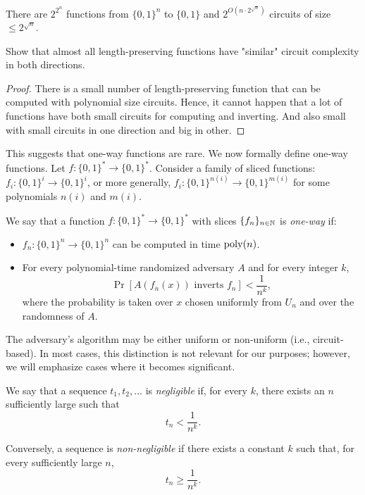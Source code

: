 \begin{statement}
    There are $2^{2^n}$ functions from $\{0, 1\}^n$ to $\{0, 1\}$ and $2^{O(n \cdot 2^{\sqrt n})}$ circuits of size $\leq 2^{\sqrt n}$.
\end{statement}

\begin{exercise}
    Show that almost all length-preserving functions have "similar" circuit complexity in both directions.
\end{exercise}

\begin{proof}
	There is a small number of length-preserving function that can be computed with polynomial size circuits.
	Hence, it cannot happen that a lot of functions have both small circuits for computing and inverting.
	And also small with small circuits in one direction and big in other.
\end{proof}

This suggests that one-way functions are rare.
We now formally define one-way functions.
Let $f \colon \{0, 1\}^* \to \{0, 1\}^*$.
Consider a family of sliced functions: $f_i \colon \{0, 1\}^i \to \{0, 1\}^i$, or more generally, $f_i \colon \{0, 1\}^{n(i)} \to \{0, 1\}^{m(i)}$ for some polynomials $n(i)$ and $m(i)$.

\begin{definition}
    We say that a function $f \colon \{0, 1\}^* \to \{0, 1\}^*$ with slices $\{f_n\}_{n \in \mathbb{N}}$ is \emph{one-way} if:
    \begin{itemize}
        \item $f_n \colon \{0, 1\}^n \to \{0, 1\}^n$ can be computed in time $\operatorname{poly}(n)$.
        \item For every polynomial-time randomized adversary $A$ and for every integer $k$,
        \[
            \Pr[A(f_n(x)) \text{ inverts } f_n] < \frac{1}{n^k},
        \] 
        where the probability is taken over $x$ chosen uniformly from $U_n$ and over the randomness of $A$.
    \end{itemize}
\end{definition}

The adversary's algorithm may be either uniform or non-uniform (i.e., circuit-based).
In most cases, this distinction is not relevant for our purposes; however, we will emphasize cases where it becomes significant.

\begin{definition}
    We say that a sequence $t_1, t_2, \ldots$ is \emph{negligible} if, for every $k$, there exists an $n$ sufficiently large such that
    \[
        t_n < \frac{1}{n^k}.
    \]
    
    Conversely, a sequence is \emph{non-negligible} if there exists a constant $k$ such that, for every sufficiently large $n$, 
    \[
        t_n \geq \frac{1}{n^k}.
    \]
\end{definition}

